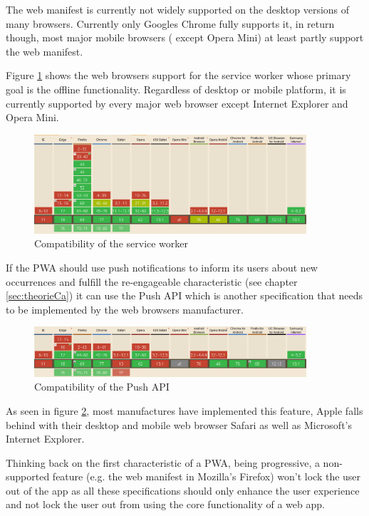 The web manifest is currently not widely supported on the desktop versions of many browsers. Currently only Googles Chrome fully supports it, in return though, most major mobile browsers ( except Opera Mini) at least partly support the web manifest. 

Figure \ref{fig:pwacompatibilityserviceworker} shows the web browsers support for the service worker whose primary goal is the offline functionality. Regardless of desktop or mobile platform, it is currently supported by every major web browser except Internet Explorer and Opera Mini.

\begin{figure}[htbp] 
	\centering
	\includegraphics[width=0.9\textwidth]{Assets/chapter_pwa/serviceworkersupport.PNG}
	\caption{Compatibility of the service worker}
	\label{fig:pwacompatibilityserviceworker}
\end{figure}

If the  \acs{PWA} should use push notifications to inform its users about new occurrences and fulfill the re-engageable characteristic (see chapter \ref{sec:theorieCa}) it can use the Push API which is another specification that needs to be implemented by the web browsers manufacturer.

\begin{figure}[htbp] 
	\centering
	\includegraphics[width=0.9\textwidth]{Assets/chapter_pwa/pushapisupport.PNG}
	\caption{Compatibility of the Push API}
	\label{fig:pwacompatibilitypushapi}
\end{figure}

As seen in figure \ref{fig:pwacompatibilitypushapi}, most manufactures have implemented this feature, Apple falls behind with their desktop and mobile web browser Safari as well as Microsoft’s Internet Explorer.

Thinking back on the first characteristic of a  \acs{PWA}, being progressive, a non-supported feature (e.g. the web manifest in Mozilla's Firefox) won’t lock the user out of the app as all these specifications should only enhance the user experience and not lock the user out from using the core functionality of a web app.